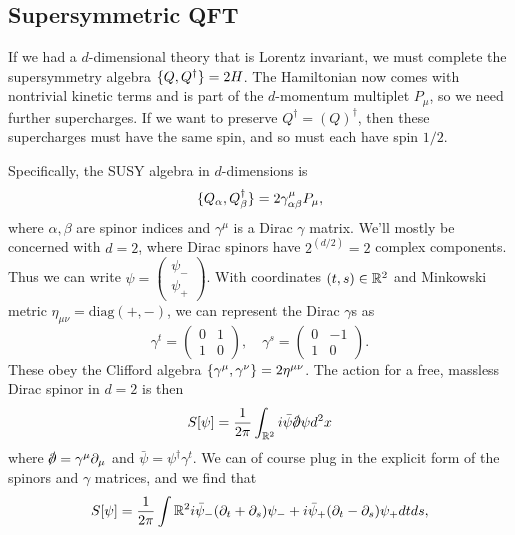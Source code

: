 \subsection*{Supersymmetric QFT}
If we had a $d$-dimensional theory that is Lorentz invariant, we must complete the supersymmetry algebra $\{Q,Q^\dagger\}=2H$. The Hamiltonian now comes with nontrivial kinetic terms and is part of the $d$-momentum multiplet $P_\mu$, so we need further supercharges. If we want to preserve $Q^\dagger =(Q)^\dagger$, then these supercharges must have the same spin, and so must each have spin $1/2$.

Specifically, the SUSY algebra in $d$-dimensions is
\begin{equation}
    \{Q_\alpha,Q_\beta^\dagger\}=2\gamma^\mu_{\alpha\beta} P_\mu,
\end{equation}
where $\alpha,\beta$ are spinor indices and $\gamma^\mu$ is a Dirac $\gamma$ matrix. We'll mostly be concerned with $d=2$, where Dirac spinors have $2^{(d/2)}=2$ complex components. Thus we can write $\psi=\begin{pmatrix}\psi_-\\\psi_+\end{pmatrix}$. With coordinates $(t,s)\in \mathbb{R}^2$ and Minkowski metric $\eta_{\mu\nu}=\text{diag}(+,-)$, we can represent the Dirac $\gamma$s as
\begin{equation}
    \gamma^t = 
    \begin{pmatrix} 
    0 & 1\\
    1& 0
    \end{pmatrix},
    \quad
    \gamma^s = 
    \begin{pmatrix} 
    0 & -1\\
    1 & 0
    \end{pmatrix}.
\end{equation}
These obey the Clifford algebra $\{\gamma^\mu, \gamma^\nu\}=2\eta^{\mu\nu}$. The action for a free, massless Dirac spinor in $d=2$ is then
\begin{equation}
    S[\psi]=\frac{1}{2\pi}\int_{\RR^2} i\bar \psi \slashed{\p} \psi d^2 x
\end{equation}
where $\slashed{\p}=\gamma^\mu \p_\mu$ and $\bar \psi=\psi^\dagger \gamma^t$. We can of course plug in the explicit form of the spinors and $\gamma$ matrices, and we find that
\begin{equation}
    S[\psi]=\frac{1}{2\pi}\int {\mathbb{R}^2} i\bar \psi_- (\partial_t +\partial_s)\psi_- +i\bar \psi_+(\partial_t-\partial_s)\psi_+ dtds,
\end{equation}
